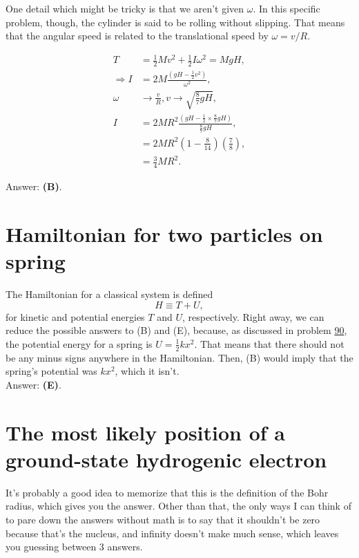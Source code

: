 \documentclass[11pt]{paper}
\newcommand{\answer}[1]{Answer: \textbf{(#1)}.}
\begin{document}
One detail which might be tricky is that we aren't given $\omega$.  In this specific problem, though, the cylinder is said to be rolling without slipping.  That means that the angular speed is related to the translational speed by $\omega = v/R$.

\begin{align}
	T &= \frac{1}{2}Mv^2 + \frac{1}{2}I\omega^2 = MgH,\\
	\Rightarrow I &= 2M\frac{\left(gH - \frac{1}{2}v^2\right)}{\omega^2},\\
	\omega&\rightarrow \frac{v}{R}, v\rightarrow\sqrt{\frac{8}{7}gH},\\
	I &= 2MR^2\frac{\left(gH - \frac{1}{2}\times\frac{8}{7}gH\right)}{\frac{8}{7}gH},\\
	&= 2MR^2\left(1-\frac{8}{14}\right)\left(\frac{7}{8}\right),\\
	&= \frac{3}{4}MR^2.
\end{align}

\answer{B}

\section{Hamiltonian for two particles on spring}

The Hamiltonian for a classical system is defined
\begin{equation}
	H\equiv T+U,
\end{equation}
for kinetic and potential energies $T$ and $U$, respectively.  Right away, we can reduce the possible answers to (B) and (E), because, as discussed in problem \hyperlink{section.90}{90}, the potential energy for a spring is $U = \frac{1}{2}kx^2$.  That means that there should not be any minus signs anywhere in the Hamiltonian.  Then, (B) would imply that the spring's potential was $kx^2$, which it isn't.\\

\answer{E}

\section{The most likely position of a ground-state hydrogenic electron}

It's probably a good idea to memorize that this is the definition of the Bohr radius, which gives you the answer.  Other than that, the only ways I can think of to pare down the answers without math is to say that it shouldn't be zero because that's the nucleus, and infinity doesn't make much sense, which leaves you guessing between 3 answers.
\end{document}
